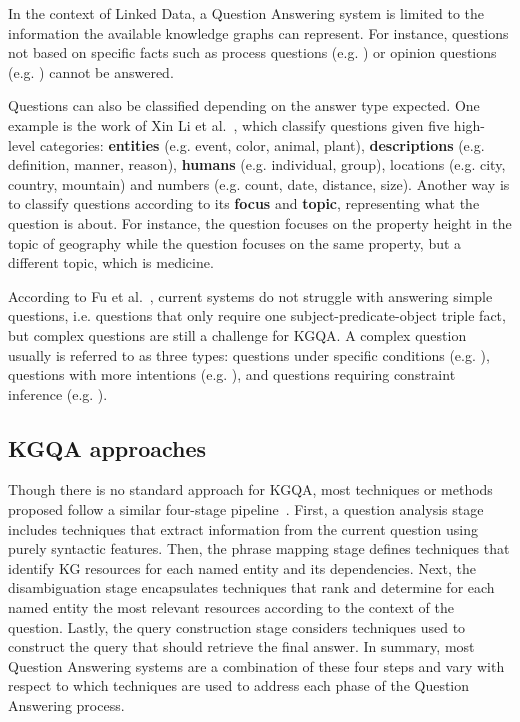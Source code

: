 In the context of Linked Data, a Question Answering system is limited to the information the 
available knowledge graphs can represent. For instance, questions not based on specific facts 
such as process questions (e.g. ) or opinion questions 
(e.g. ) cannot be answered.

Questions can also be classified depending on the answer type expected. One example is the work 
of Xin Li et al.~\cite{qa:LiR02}, which classify questions given five high-level categories: 
\textbf{entities} (e.g. event, color, animal, plant), \textbf{descriptions} (e.g. definition, 
manner, reason), \textbf{humans} (e.g. individual, group), locations (e.g. city, country, 
mountain) and numbers (e.g. count, date, distance, size). Another way is to classify questions 
according to its \textbf{focus} and \textbf{topic}, representing what the question is about. 
For instance, the question  focuses on the 
property height in the topic of geography while the question  focuses on the same property, but a different topic, which is medicine.

According to Fu et al.~\cite{qa:FuQTLYS20abs-2007-13069}, current systems do not struggle with 
answering simple questions, i.e. questions that only require one subject-predicate-object 
triple fact, but complex questions are still a challenge for KGQA. A complex question usually 
is referred to as three types: questions under specific conditions (e.g. ), questions with more intentions (e.g. 
), and questions requiring constraint inference (e.g. ).

\subsection{KGQA approaches}
\label{cap2:theoFrame/qakg/approaches}
Though there is no standard approach for KGQA, most techniques or methods proposed follow a 
similar four-stage pipeline~\cite{qa:core-techniques-DiefenbachLSM18}. First, a question 
analysis stage includes techniques that extract information from the current question using 
purely syntactic features. Then, the phrase mapping stage defines techniques that identify KG 
resources for each named entity and its dependencies. Next, the disambiguation stage 
encapsulates techniques that rank and determine for each named entity the most relevant 
resources according to the context of the question. Lastly, the query construction stage 
considers techniques used to construct the \SPARQL{} query that should retrieve the final answer. 
In summary, most Question Answering systems are a combination of these four steps and vary with 
respect to which techniques are used to address each phase of the Question Answering process.

